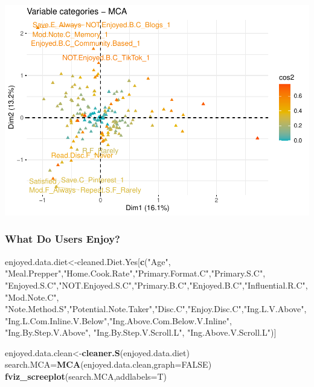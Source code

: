 \documentclass[
]{article}
\newenvironment{Shaded}{\begin{snugshade}}{\end{snugshade}}
\newcommand{\DataTypeTok}[1]{\textcolor[rgb]{0.13,0.29,0.53}{#1}}
\newcommand{\KeywordTok}[1]{\textcolor[rgb]{0.13,0.29,0.53}{\textbf{#1}}}
\newcommand{\NormalTok}[1]{#1}
\newcommand{\OtherTok}[1]{\textcolor[rgb]{0.56,0.35,0.01}{#1}}
\newcommand{\StringTok}[1]{\textcolor[rgb]{0.31,0.60,0.02}{#1}}
\begin{document}
\includegraphics{Average-User-MCA_files/figure-latex/diet no all-3.pdf}

\hypertarget{what-do-users-enjoy-1}{%
\subsubsection{What Do Users Enjoy?}\label{what-do-users-enjoy-1}}

\begin{Shaded}
\begin{Highlighting}[]
\NormalTok{enjoyed.data.diet<-cleaned.Diet.Yes[}\KeywordTok{c}\NormalTok{(}\StringTok{"Age"}\NormalTok{, }\StringTok{"Meal.Prepper"}\NormalTok{,}\StringTok{"Home.Cook.Rate"}\NormalTok{,}\StringTok{"Primary.Format.C"}\NormalTok{,}\StringTok{"Primary.S.C"}\NormalTok{,}
            \StringTok{"Enjoyed.S.C"}\NormalTok{,}\StringTok{"NOT.Enjoyed.S.C"}\NormalTok{,}\StringTok{"Primary.B.C"}\NormalTok{,}\StringTok{"Enjoyed.B.C"}\NormalTok{,}\StringTok{"Influential.R.C"}\NormalTok{, }
            \StringTok{"Mod.Note.C"}\NormalTok{, }
            \StringTok{"Note.Method.S"}\NormalTok{,}\StringTok{"Potential.Note.Taker"}\NormalTok{,}\StringTok{"Disc.C"}\NormalTok{,}\StringTok{"Enjoy.Disc.C"}\NormalTok{,}\StringTok{"Ing.L.V.Above"}\NormalTok{,}
            \StringTok{"Ing.L.Com.Inline.V.Below"}\NormalTok{,}\StringTok{"Ing.Above.Com.Below.V.Inline"}\NormalTok{,  }\StringTok{"Ing.By.Step.V.Above"}\NormalTok{,  }\StringTok{"Ing.By.Step.V.Scroll.L"}\NormalTok{,}
            \StringTok{"Ing.Above.V.Scroll.L"}\NormalTok{)]}

\NormalTok{enjoyed.data.clean<-}\KeywordTok{cleaner.S}\NormalTok{(enjoyed.data.diet)}
\NormalTok{search.MCA=}\KeywordTok{MCA}\NormalTok{(enjoyed.data.clean,}\DataTypeTok{graph=}\OtherTok{FALSE}\NormalTok{)}
\KeywordTok{fviz_screeplot}\NormalTok{(search.MCA,}\DataTypeTok{addlabels=}\NormalTok{T)}
\end{Highlighting}
\end{Shaded}
\end{document}
